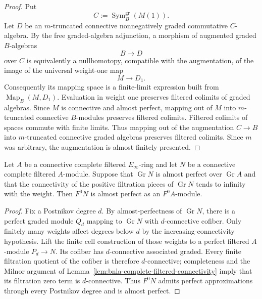 \begin{proof}
Put
\[
    C:=\operatorname{Sym}^{\mathrm{gr}}_B(M(1)).
\]
Let $D$ be an $m$-truncated connective nonnegatively graded commutative
$C$-algebra.  By the free graded-algebra adjunction, a morphism of augmented
graded $B$-algebras
\[
    B\longrightarrow D
\]
over $C$ is equivalently a nullhomotopy, compatible with the augmentation, of
the image of the universal weight-one map
\[
    M\longrightarrow D_1.
\]
Consequently its mapping space is a finite-limit expression built from
$\operatorname{Map}_B(M,D_1)$.  Evaluation in weight one preserves filtered
colimits of graded algebras.  Since $M$ is connective and almost perfect,
mapping out of $M$ into $m$-truncated connective $B$-modules preserves
filtered colimits.  Filtered colimits of spaces commute with finite limits.
Thus mapping out of the augmentation $C\to B$ into $m$-truncated connective
graded algebras preserves filtered colimits.  Since $m$ was arbitrary, the
augmentation is almost finitely presented.
\end{proof}

\begin{lemma}
\label{lem:bnla-complete-filtered-aperf}
Let $A$ be a connective complete filtered $E_\infty$-ring and let $N$ be a
connective complete filtered $A$-module.  Suppose that
$\operatorname{Gr}N$ is almost perfect over $\operatorname{Gr}A$ and that the
connectivity of the positive filtration pieces of $\operatorname{Gr}N$ tends
to infinity with the weight.  Then $F^0N$ is almost perfect as an
$F^0A$-module.
\end{lemma}

\begin{proof}
Fix a Postnikov degree $d$.  By almost-perfectness of $\operatorname{Gr}N$,
there is a perfect graded module $Q_d$ mapping to $\operatorname{Gr}N$ with
$d$-connective cofiber.  Only finitely many weights affect degrees below $d$
by the increasing-connectivity hypothesis.  Lift the finite cell construction
of those weights to a perfect filtered $A$-module $P_d\to N$.  Its cofiber
has $d$-connective associated graded.  Every finite filtration quotient of the
cofiber is therefore $d$-connective; completeness and the Milnor argument of
Lemma~\ref{lem:bnla-complete-filtered-connectivity} imply that its filtration
zero term is $d$-connective.  Thus $F^0N$ admits perfect approximations through
every Postnikov degree and is almost perfect.
\end{proof}

